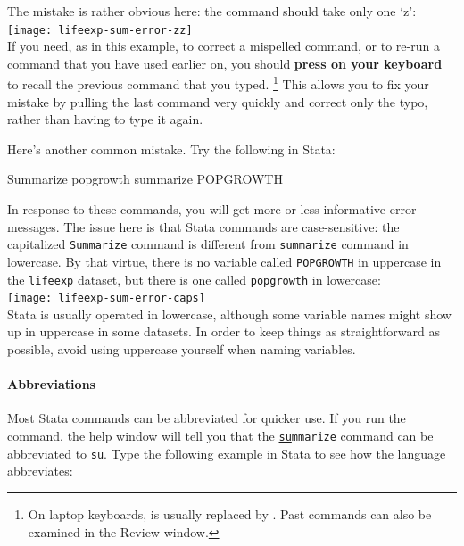     The mistake is rather obvious here: the  command should take only one `z':\\[1em]%
    
    \texttt{[image: lifeexp-sum-error-zz]}\\[1em]
    
    If you need, as in this example, to correct a mispelled command, or to re-run a command that you have used earlier on, you should \textbf{press  on your keyboard} to recall the previous command that you typed.%
    \footnote{On laptop keyboards,  is usually replaced by . Past commands can also be examined in the Review window.} %
    This allows you to fix your mistake by pulling the last command very quickly and correct only the typo, rather than having to type it again.%

    Here's another common mistake. Try the following in Stata:%
    
    \begin{docspec}
      Summarize popgrowth
      summarize POPGROWTH
    \end{docspec}

    In response to these commands, you will get more or less informative error messages. The issue here is that Stata commands are case-sensitive: the capitalized \texttt{Summarize} command is different from \texttt{summarize} command in lowercase. By that virtue, there is no variable called \texttt{POPGROWTH} in uppercase in the \texttt{lifeexp} dataset, but there is one called \texttt{popgrowth} in lowercase:\\[1em]%

    \texttt{[image: lifeexp-sum-error-caps]}\\[1em]
    
    Stata is usually operated in lowercase, although some variable names might show up in uppercase in some datasets. In order to keep things as straightforward as possible, avoid using uppercase yourself when naming variables.%
    
    \paragraph{Abbreviations}%

    Most Stata commands can be abbreviated for quicker use. If you run the  command, the help window will tell you that the \texttt{\underline{su}mmarize} command can be abbreviated to \texttt{su}. Type the following example in Stata to see how the language abbreviates:%
    
